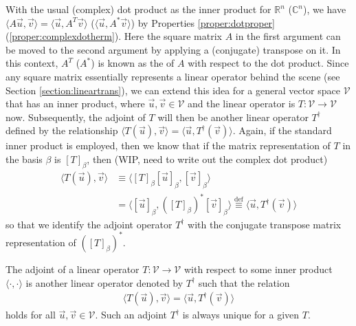 With the usual (complex) dot product as the inner product for $\mathbb{R}^n$ ($\mathbb{C}^n$), we have $\langle A\vec{u}, \vec{v} \rangle = \langle \vec{u}, A^T\vec{v} \rangle$ ($\langle \vec{u}, A^*\vec{v} \rangle$) by Properties \ref{proper:dotproper} (\ref{proper:complexdotherm}). Here the square matrix $A$ in the first argument can be moved to the second argument by applying a (conjugate) transpose on it. In this context, $A^T$ ($A^*$) is known as the  of $A$ with respect to the dot product. Since any square matrix essentially represents a linear operator behind the scene (see Section \ref{section:lineartrans}), we can extend this idea for a general vector space $\mathcal{V}$ that has an inner product, where $\vec{u}, \vec{v} \in \mathcal{V}$ and the linear operator is $T: \mathcal{V} \to \mathcal{V}$ now. Subsequently, the adjoint of $T$ will then be another linear operator $T^\dag$ defined by the relationship $\langle T(\vec{u}), \vec{v} \rangle = \langle \vec{u}, T^\dag(\vec{v}) \rangle$. Again, if the standard inner product is employed, then we know that if the matrix representation of $T$ in the basis $\beta$ is $[T]_\beta$, then (WIP, need to write out the complex dot product)
\begin{align*}
\langle T(\vec{u}), \vec{v} \rangle &\equiv \langle [T]_\beta[\vec{u}]_\beta, [\vec{v}]_\beta \rangle \\ 
&= \langle [\vec{u}]_\beta, ([T]_\beta)^*[\vec{v}]_\beta \rangle \stackrel{\text{def}}{\equiv} \langle \vec{u}, T^\dag(\vec{v}) \rangle
\end{align*}
so that we identify the adjoint operator $T^\dag$ with the conjugate transpose matrix representation of $([T]_\beta)^*$. 
\begin{defn}[Adjoint]
\label{defn:adjoint}
The adjoint of a linear operator $T: \mathcal{V} \to \mathcal{V}$ with respect to some inner product $\langle \cdot, \cdot \rangle$ is another linear operator denoted by $T^\dag$ such that the relation
\begin{align*}
\langle T(\vec{u}), \vec{v} \rangle = \langle \vec{u}, T^\dag(\vec{v}) \rangle    
\end{align*}
holds for all $\vec{u}, \vec{v} \in \mathcal{V}$. Such an adjoint $T^\dag$ is always unique for a given $T$. 
\end{defn}
